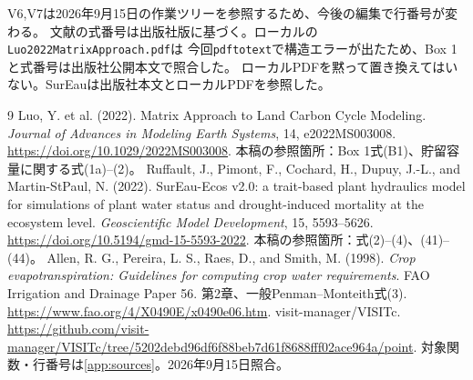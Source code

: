 \documentclass[a4paper,11pt]{ltjsarticle}
\newcommand{\code}[1]{\nolinkurl{#1}}
\begin{document}
V6,V7は2026年9月15日の作業ツリーを参照するため、今後の編集で行番号が変わる。
文献の式番号は出版社版に基づく。ローカルの\code{Luo2022MatrixApproach.pdf}は
今回\code{pdftotext}で構造エラーが出たため、Box 1と式番号は出版社公開本文で照合した。
ローカルPDFを黙って置き換えてはいない。SurEauは出版社本文とローカルPDFを参照した。

\begin{thebibliography}{9}
 Luo, Y. et al. (2022).
Matrix Approach to Land Carbon Cycle Modeling.
\textit{Journal of Advances in Modeling Earth Systems}, 14, e2022MS003008.
\url{https://doi.org/10.1029/2022MS003008}.
本稿の参照箇所：Box 1式(B1)、貯留容量に関する式(1a)--(2)。
 Ruffault, J., Pimont, F., Cochard, H., Dupuy, J.-L., and Martin-StPaul, N. (2022).
SurEau-Ecos v2.0: a trait-based plant hydraulics model for simulations of plant water status and drought-induced mortality at the ecosystem level.
\textit{Geoscientific Model Development}, 15, 5593--5626.
\url{https://doi.org/10.5194/gmd-15-5593-2022}.
本稿の参照箇所：式(2)--(4)、(41)--(44)。
 Allen, R. G., Pereira, L. S., Raes, D., and Smith, M. (1998).
\textit{Crop evapotranspiration: Guidelines for computing crop water requirements}.
FAO Irrigation and Drainage Paper 56. 第2章、一般Penman--Monteith式(3).
\url{https://www.fao.org/4/X0490E/x0490e06.htm}.
 visit-manager/VISITc.
\url{https://github.com/visit-manager/VISITc/tree/5202debd96df6f88beb7d61f8688fff02ace964a/point}.
対象関数・行番号は\ref{app:sources}。2026年9月15日照合。
\end{thebibliography}
\end{document}
